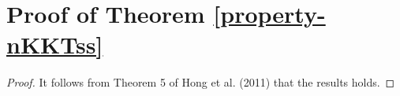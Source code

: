 \section{Proof of Theorem \ref{property-nKKTss}}

\begin{proof}
It follows from Theorem 5 of Hong et al. (2011) that the results
holds.
\end{proof}



